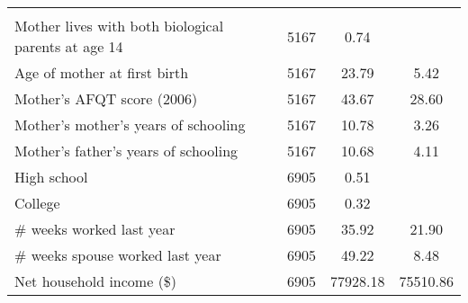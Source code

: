 \begin{tabular}{l c S[table-format = 5.2] S[table-format= 5.2] }
\addlinespace {} \\
\hspace{0.4em}Mother lives with both biological parents at age 14& 5167  &     0.74&       \\
\hspace{0.4em}Age of mother at first birth& 5167  &    23.79&      5.42  \\
\hspace{0.4em}Mother's AFQT score (2006)&  5167   &  43.67&     28.60  \\
\hspace{0.4em}Mother's mother's years of schooling& 5167   &   10.78&      3.26  \\
\hspace{0.4em}Mother's father's years of schooling& 5167   &   10.68&      4.11  \\
\hspace{0.4em}High school & 6905   &  0.51   &  \\
\hspace{0.4em}College &  6905   &   0.32   & \\
\hspace{0.4em}$\#$ weeks worked last year&  6905  &   35.92&     21.90  \\
\hspace{0.4em}$\#$ weeks spouse worked last year& 6905   &   49.22&      8.48 \\
\hspace{0.4em}Net household income (\$)& 6905 &  77928.18&  75510.86  \\
\bottomrule
\end{tabular}

